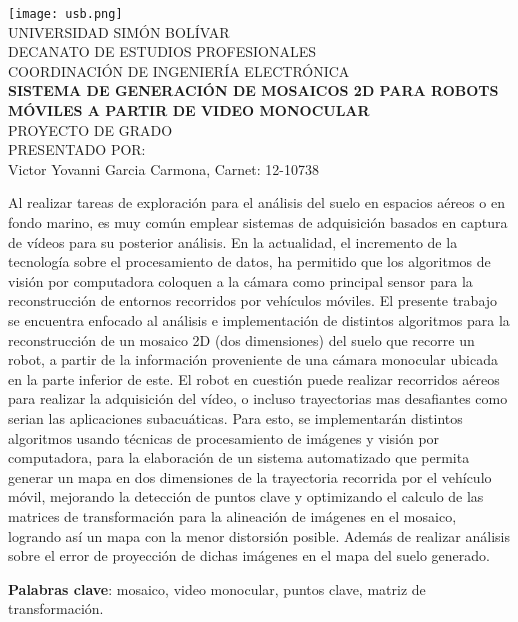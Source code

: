 \begin{titlepage}
    \begin{center}

        \texttt{[image: usb.png]} \\
        \textsc {\large UNIVERSIDAD SIMÓN BOLÍVAR} \\
        \textsc{DECANATO DE ESTUDIOS PROFESIONALES\\
        COORDINACIÓN DE INGENIERÍA ELECTRÓNICA}\\
        \textbf{SISTEMA DE GENERACIÓN DE MOSAICOS 2D PARA ROBOTS MÓVILES A PARTIR DE VIDEO MONOCULAR} \\
        PROYECTO DE GRADO \\
        PRESENTADO POR: \\
        Victor Yovanni Garcia Carmona, Carnet: 12-10738

    \end{center}
\abstract
{
    Al realizar tareas de exploración para el análisis del suelo en espacios aéreos o en fondo marino, es muy común emplear sistemas de adquisición basados en captura de vídeos para su posterior análisis. En la actualidad, el incremento de la tecnología sobre el procesamiento de datos, ha permitido que los algoritmos de visión por computadora coloquen a la cámara como principal sensor para la reconstrucción de entornos recorridos por vehículos móviles. El presente trabajo se encuentra enfocado al análisis e implementación de distintos algoritmos para la reconstrucción de un mosaico 2D (dos dimensiones) del suelo que recorre un robot, a partir de la información proveniente de una cámara monocular ubicada en la parte inferior de este. El robot en cuestión puede realizar recorridos aéreos para realizar la adquisición del vídeo, o incluso trayectorias mas desafiantes como serian las aplicaciones subacuáticas. Para esto, se implementarán distintos algoritmos usando técnicas de procesamiento de imágenes y visión por computadora, para la elaboración de un sistema automatizado que permita generar un mapa en dos dimensiones de la trayectoria recorrida por el vehículo móvil, mejorando la detección de puntos clave y optimizando el calculo de las matrices de transformación para la alineación de imágenes en el mosaico, logrando así un mapa con la menor distorsión posible. Además de realizar análisis sobre el error de proyección de dichas imágenes en el mapa del suelo generado.
    
}

\noindent \begin{small} \textbf{Palabras clave}: mosaico, video monocular, puntos clave, matriz de transformación. 
\end{small}
	
\clearpage
{}

\end{titlepage}